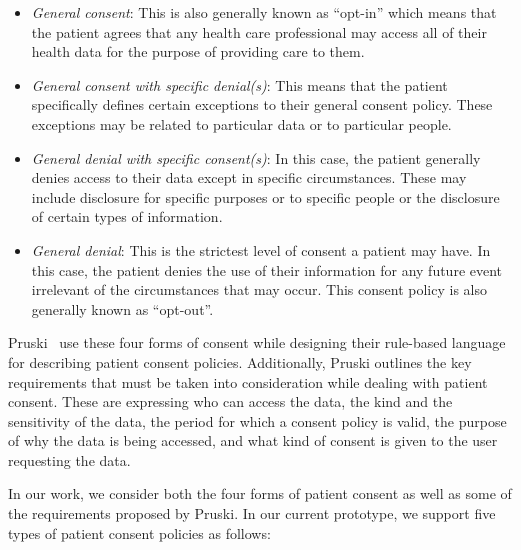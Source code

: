 \documentclass[conference]{IEEEtran}
\begin{document}
\begin{itemize}
 \item \textit{General consent}: This is also generally known as ``opt-in'' which means that the patient agrees that any health care professional may access
all of their health data for the purpose of providing care to them.
\item \textit{General consent with specific denial(s)}: This means that the patient specifically defines certain exceptions to their general consent policy.
These exceptions may be related to particular data or to particular people.
\item \textit{General denial with specific consent(s)}: In this case, the patient generally denies access to their data except in specific circumstances. These
may include disclosure for specific purposes or to specific people or the disclosure of certain types of information.
\item \textit{General denial}: This is the strictest level of consent a patient may have. In this case, the patient denies the use of their information for any
future event irrelevant of the circumstances that may occur. This consent policy is also generally known as ``opt-out''.
\end{itemize}

Pruski~\cite{pruski2010} use these four forms of consent while designing their rule-based language for describing patient consent policies. Additionally,
Pruski outlines the key requirements that must be taken into consideration while dealing with patient consent. These are expressing who can access the data,
the kind and the sensitivity of the data, the period for which a consent policy is valid, the purpose of why the data is being accessed, and what kind of
consent is given to the user requesting the data. 

In our work, we consider both the four forms of patient consent as well as some of the requirements proposed by Pruski. In our current prototype, we support
five types of patient consent policies as follows:
\end{document}
